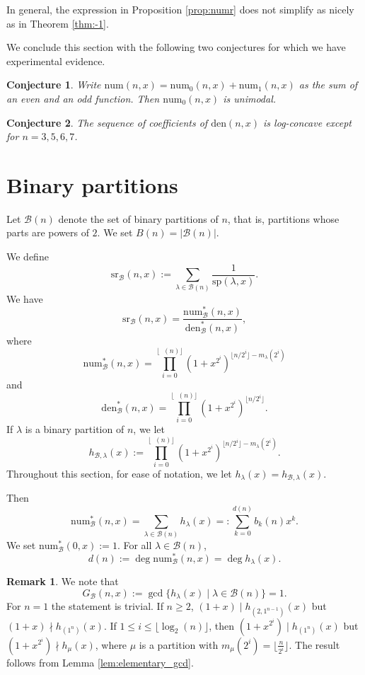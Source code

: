 \documentclass[reqno]{amsart}
\def\sp{\mathrm{sp}}
\def\sr{\mathrm{sr}}
\def\den{\mathrm{den}}
\def\num{\mathrm{num}}
\def\B{\mathcal{B}}
\DeclareMathOperator{\lb}{\log_2}
\newtheorem{conjecture}{Conjecture}
\theoremstyle{definition}
\newtheorem{remark}{Remark}
\begin{document}
In general, the expression in Proposition \ref{prop:numr} does not simplify as nicely as in Theorem \ref{thm:-1}. 







We conclude this section with the following two conjectures for which we have experimental evidence.


\begin{conjecture} 
 Write $\num(n,x)=\num_0(n,x)+\num_1(n,x)$ as the sum of an even and an odd function. Then  $\num_0(n,x)$ is unimodal. 
\end{conjecture} 



\begin{conjecture} 
The sequence of coefficients of $\den(n,x)$ is log-concave except for $n=3,5,6,7$.
\end{conjecture} 


\section{Binary partitions}\label{sec:binary}



Let $\mathcal{B}(n)$ denote the set of binary partitions of $n$, that is, partitions whose parts are powers of $2$. We set $B(n)=|\mathcal B(n)|$. 

We define $$\sr_\mathcal{B}(n,x):=\sum_{\lambda \in \mathcal{B}(n)} \frac{1}{\sp(\lambda, x)}.$$
We have $$\sr_\mathcal{B}(n,x)=\frac{\num^*_{\mathcal B}(n,x)}{\den^*_{\mathcal B}(n,x)},$$ where 
\[\num^\ast_{\mathcal B}(n,x)=\prod_{i=0}^{\lfloor\lb(n)\rfloor}(1+x^{2^i})^{\lfloor n/2^i\rfloor-m_\lambda(2^i)}\]and
\[\den_{\B}^\ast(n,x)=\prod_{i=0}^{\lfloor\lb(n)\rfloor}(1+x^{2^i})^{\lfloor n/2^i\rfloor}.\]
If $\lambda$ is a binary partition of $n$,  we let $$h_{\mathcal B,\lambda}(x):=\prod_{i=0}^{\lfloor \lb(n)\rfloor}(1+x^{2^i})^{\lfloor n/2^i\rfloor-m_\lambda(2^i)}.$$ Throughout this section, for ease of notation, we let $h_\lambda(x)=h_{\mathcal B, \lambda}(x).$

Then
\[\num^\ast_{\mathcal B}(n,x)=\sum_{\lambda\in\mathcal B(n)}h_\lambda(x)=:\sum_{k=0}^{d(n)}b_k(n)x^k.\]
We set $\num^\ast_{\B}(0,x):=1$.
 For all $\lambda\in\mathcal B(n)$, 
    \[d(n):=\deg \num^*_{\mathcal B}(n,x) =\deg h_\lambda(x).\]


   \begin{remark} We note that $$G_{\mathcal B}(n,x):=\gcd\{h_{\lambda}(x) \mid \lambda\in \mathcal B(n)\}=1.$$  For $n=1$ the statement is trivial. If $n\geq 2$, $(1+x)\mid h_{(2,1^{n-1})}(x)$ but $(1+x)\nmid h_{(1^n)}(x)$. If $1\leq i\leq \lfloor \log_2 (n)\rfloor$, then $(1+x^{2^i})\mid h_{(1^n)}(x)$ but $(1+x^{2^i})\nmid h_\mu(x)$, where $\mu$ is a partition with $m_\mu(2^i)=\lfloor \frac{n}{2^i}\rfloor$. The result follows from Lemma \ref{lem:elementary_gcd}.
   \end{remark}
\end{document}
